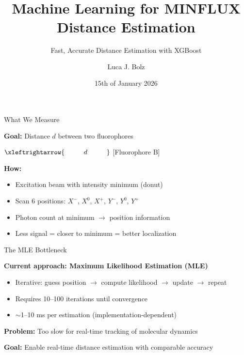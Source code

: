 \documentclass[aspectratio=169]{beamer}
\title{Machine Learning for MINFLUX Distance Estimation}
\subtitle{Fast, Accurate Distance Estimation with XGBoost}
\author{Luca J. Bolz}
\institute{
    Max Planck Institute for Multidisciplinary Sciences\\
    Kiel University
}
\date{15th of January 2026}
\begin{document}
\begin{frame}
    \titlepage
\end{frame}

\begin{frame}{What We Measure}

    \textbf{Goal:} Distance $d$ between two fluorophores

    \vspace{0.8cm}

    \centering
    \begin{Large}
        [Fluorophore A] \hspace{0.5cm} $\xleftrightarrow{\hspace{1cm} d \hspace{1cm}}$ \hspace{0.5cm} [Fluorophore B]
    \end{Large}

    \vspace{1cm}

    \raggedright
    \textbf{How:}
    \begin{itemize}
        \item Excitation beam with intensity minimum (donut)
        \item Scan 6 positions: $X^-$, $X^0$, $X^+$, $Y^-$, $Y^0$, $Y^+$
        \item Photon count at minimum $\rightarrow$ position information
        \item Less signal = closer to minimum = better localization
    \end{itemize}

\end{frame}

\begin{frame}{The MLE Bottleneck}

    \textbf{Current approach: Maximum Likelihood Estimation (MLE)}
    \begin{itemize}
        \item Iterative: guess position $\rightarrow$ compute likelihood $\rightarrow$ update $\rightarrow$ repeat
        \item Requires 10--100 iterations until convergence
        \item $\sim$1--10 ms per estimation (implementation-dependent)
    \end{itemize}

    \vspace{0.8cm}

    \textbf{Problem:} Too slow for real-time tracking of molecular dynamics

    \vspace{0.5cm}

    \textbf{Goal:} Enable real-time distance estimation with comparable accuracy

\end{frame}
\end{document}
